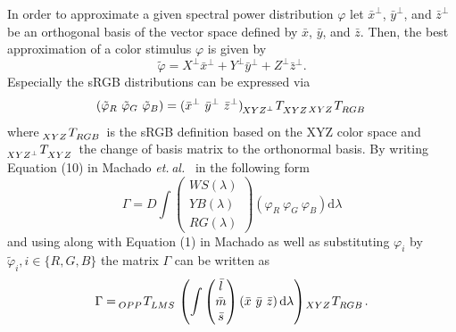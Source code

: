 \documentclass{sig-alternate-05-2015}
\newcommand{\etal}{\textit{et. al.}}
\newcommand{\dlambda}{\mathrm{d}\lambda}
\begin{document}
In order to approximate a given spectral power distribution $\varphi$ let $\bar x^\perp$, $\bar y^\perp$, and $\bar z^\perp$ be an orthogonal basis of the vector space defined by $\bar x$, $\bar y$, and $\bar z$.
Then, the best approximation of a color stimulus $\varphi$ is given by
\begin{equation}
    \tilde\varphi = X^\perp \bar x^\perp + Y^\perp \bar y^\perp + Z^\perp \bar z^\perp.
\end{equation}
Especially the sRGB distributions can be expressed via
\begin{equation}
    (\tilde\varphi_R\ \tilde\varphi_G\ \tilde\varphi_B) = (\bar x^\perp\ \bar y^\perp\ \bar z^\perp) \tensor[_{XYZ^\perp}]{T}{_{XYZ}} \tensor[_{XYZ}]{T}{_{RGB}}
\end{equation}
where $\tensor[_{XYZ}]{T}{_{RGB}}$ is the sRGB definition based on the XYZ color space and $\tensor[_{XYZ^\perp}]{T}{_{XYZ}}$ the change of basis matrix to the orthonormal basis.
By writing Equation (10) in Machado \etal~\cite{Machado2009} in the following form
\begin{equation}
    \Gamma = 
    D
    \int
    \begin{pmatrix} WS(\lambda) \\ YB(\lambda) \\ RG(\lambda) \end{pmatrix}
    \left( \varphi_R\ \varphi_G\ \varphi_B \right)
    \dlambda
\end{equation}
and using  along with Equation (1) in Machado as well as substituting $\varphi_i$ by $\tilde\varphi_i, i \in \{R, G, B\}$ the matrix $\Gamma$ can be written as
\begin{equation}
    \Gamma =
    \tensor[_{OPP}]{T}{_{LMS}}
    \left(
        \int
        \begin{pmatrix} \bar l \\ \bar m \\ \bar s \end{pmatrix}
        \left( \bar x\ \bar y\ \bar z \right)
        \dlambda
    \right)
    \tensor[_{XYZ}]{T}{_{RGB}}.
\end{equation}
\end{document}
